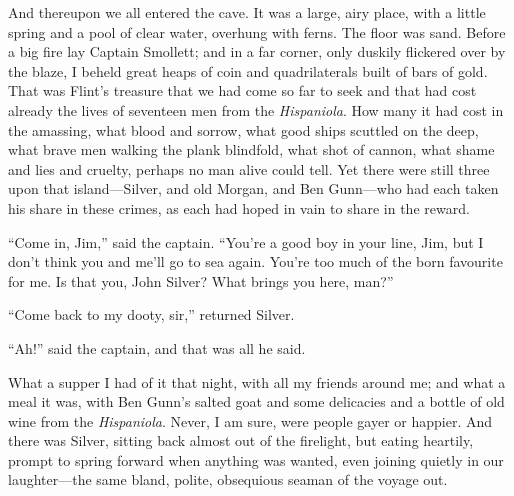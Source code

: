 And thereupon we all entered the cave. It was a large, airy place, with a little spring and a pool of clear water, overhung with ferns. The floor was sand. Before a big fire lay Captain Smollett; and in a far corner, only duskily flickered over by the blaze, I beheld great heaps of coin and quadrilaterals built of bars of gold. That was Flint’s treasure that we had come so far to seek and that had cost already the lives of seventeen men from the \textit{Hispaniola}. How many it had cost in the amassing, what blood and sorrow, what good ships scuttled on the deep, what brave men walking the plank blindfold, what shot of cannon, what shame and lies and cruelty, perhaps no man alive could tell. Yet there were still three upon that island---Silver, and old Morgan, and Ben Gunn---who had each taken his share in these crimes, as each had hoped in vain to share in the reward.

\enquote{Come in, Jim,} said the captain. \enquote{You’re a good boy in your line, Jim, but I don’t think you and me’ll go to sea again. You’re too much of the born favourite for me. Is that you, John Silver? What brings you here, man?}

\enquote{Come back to my dooty, sir,} returned Silver.

\enquote{Ah!} said the captain, and that was all he said.

What a supper I had of it that night, with all my friends around me; and what a meal it was, with Ben Gunn’s salted goat and some delicacies and a bottle of old wine from the \textit{Hispaniola}. Never, I am sure, were people gayer or happier. And there was Silver, sitting back almost out of the firelight, but eating heartily, prompt to spring forward when anything was wanted, even joining quietly in our laughter---the same bland, polite, obsequious seaman of the voyage out.